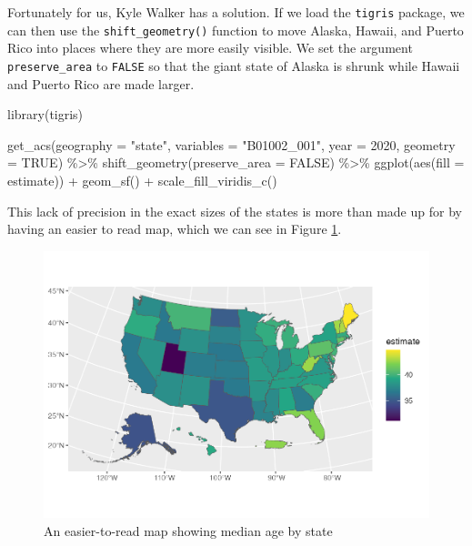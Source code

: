 \documentclass[
]{book}
\newenvironment{Shaded}{\begin{snugshade}}{\end{snugshade}}
\newcommand{\AttributeTok}[1]{\textcolor[rgb]{0.77,0.63,0.00}{#1}}
\newcommand{\ConstantTok}[1]{\textcolor[rgb]{0.00,0.00,0.00}{#1}}
\newcommand{\DecValTok}[1]{\textcolor[rgb]{0.00,0.00,0.81}{#1}}
\newcommand{\FunctionTok}[1]{\textcolor[rgb]{0.00,0.00,0.00}{#1}}
\newcommand{\NormalTok}[1]{#1}
\newcommand{\SpecialCharTok}[1]{\textcolor[rgb]{0.00,0.00,0.00}{#1}}
\newcommand{\StringTok}[1]{\textcolor[rgb]{0.31,0.60,0.02}{#1}}
\begin{document}
Fortunately for us, Kyle Walker has a solution. If we load the \texttt{tigris} package, we can then use the \texttt{shift\_geometry()} function to move Alaska, Hawaii, and Puerto Rico into places where they are more easily visible. We set the argument \texttt{preserve\_area} to \texttt{FALSE} so that the giant state of Alaska is shrunk while Hawaii and Puerto Rico are made larger.

\begin{Shaded}
\begin{Highlighting}[]
\FunctionTok{library}\NormalTok{(tigris)}

\FunctionTok{get\_acs}\NormalTok{(}\AttributeTok{geography =} \StringTok{"state"}\NormalTok{,}
        \AttributeTok{variables =} \StringTok{"B01002\_001"}\NormalTok{,}
        \AttributeTok{year =} \DecValTok{2020}\NormalTok{,}
        \AttributeTok{geometry =} \ConstantTok{TRUE}\NormalTok{) }\SpecialCharTok{\%\textgreater{}\%} 
  \FunctionTok{shift\_geometry}\NormalTok{(}\AttributeTok{preserve\_area =} \ConstantTok{FALSE}\NormalTok{) }\SpecialCharTok{\%\textgreater{}\%} 
  \FunctionTok{ggplot}\NormalTok{(}\FunctionTok{aes}\NormalTok{(}\AttributeTok{fill =}\NormalTok{ estimate)) }\SpecialCharTok{+}
  \FunctionTok{geom\_sf}\NormalTok{() }\SpecialCharTok{+}
  \FunctionTok{scale\_fill\_viridis\_c}\NormalTok{()}
\end{Highlighting}
\end{Shaded}

This lack of precision in the exact sizes of the states is more than made up for by having an easier to read map, which we can see in Figure \ref{fig:median-age-map-good}.

\begin{figure}
\includegraphics[width=1\linewidth]{accessing-data_files/figure-latex/median-age-map-good-1} \caption{An easier-to-read map showing median age by state}\label{fig:median-age-map-good}
\end{figure}
\end{document}
